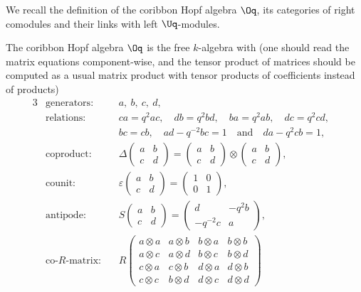 We recall the definition of the coribbon Hopf algebra $\Oq$, its categories of right comodules and their links with left $\Uq$-modules.
\begin{Definition}
The coribbon Hopf algebra $\Oq$ is the free $k$-algebra with
(one should read the matrix equations component-wise, and the tensor product of matrices should be computed as a usual matrix product with tensor products of coefficients instead of products)
\begin{alignat*}{3}
& \text{generators}\colon&& a,\ b,\ c,\ d,&
\\
& \text{relations}\colon&& ca = q^2ac,\quad db = q^2bd,\quad ba = q^2ab,\quad dc = q^2cd,&
\\
&&& bc = cb,\quad ad - q^{-2}bc = 1\quad \text{and}\quad da - q^2cb = 1,&
\\
&\text{coproduct}\colon&&\Delta\begin{pmatrix} a & b \\[-.5ex] c & d \end{pmatrix}
= \begin{pmatrix} a & b \\[-.5ex] c & d \end{pmatrix} \otimes \begin{pmatrix} a & b \\[-.5ex] c & d \end{pmatrix}\!,&
\\
& \text{counit}\colon&& \varepsilon \begin{pmatrix} a & b \\[-.5ex] c & d \end{pmatrix}
= \begin{pmatrix} 1& 0 \\[-.5ex] 0 & 1\end{pmatrix}\!,&
\\
& \text{antipode}\colon&& S \begin{pmatrix} a & b \\[-.5ex] c & d \end{pmatrix}
= \begin{pmatrix} d & -q^2b \\[-.5ex] -q^{-2}c & a \end{pmatrix}\!,&
\\
&\text{co-}R\text{-matrix}\colon&& R \begin{pmatrix}
a \otimes a & a \otimes b & b \otimes a & b \otimes b
\\
a \otimes c & a \otimes d & b \otimes c & b\otimes d\\ c\otimes a & c\otimes b & d \otimes a & d\otimes b\\ c\otimes c & b\otimes d & d\otimes c & d\otimes d \end{pmatrix}

\end{alignat*}
\end{Definition}
